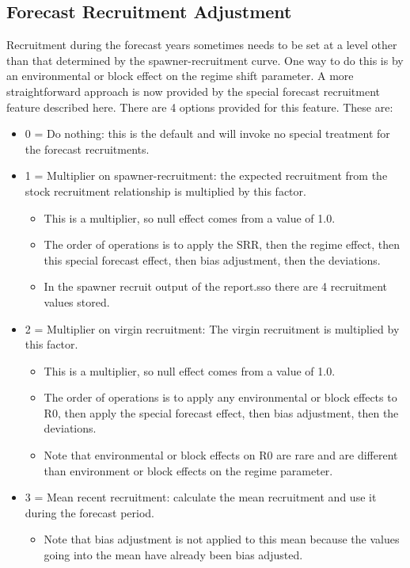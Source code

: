\subsection{Forecast Recruitment Adjustment}
Recruitment during the forecast years sometimes needs to be set at a level other than that determined by the spawner-recruitment curve. One way to do this is by an environmental or block effect on the regime shift parameter. A more straightforward approach is now provided by the special forecast recruitment feature described here. There are 4 options provided for this feature. These are:

\begin{itemize}
	\item 0 = Do nothing: this is the default and will invoke no special treatment for the forecast recruitments.
	\item 1 = Multiplier on spawner-recruitment: the expected recruitment from the stock recruitment relationship is multiplied by this factor.
	\begin{itemize}
		\item This is a multiplier, so null effect comes from a value of 1.0.
		\item The order of operations is to apply the SRR, then the regime effect, then this special forecast effect, then bias adjustment, then the deviations.
		\item In the spawner recruit output of the report.sso there are 4 recruitment values stored.
	\end{itemize}
	\item 2 = Multiplier on virgin recruitment: The virgin recruitment is multiplied by this factor.
	\begin{itemize}
		\item This is a multiplier, so null effect comes from a value of 1.0.
		\item The order of operations is to apply any environmental or block effects to R0, then apply the special forecast effect, then bias adjustment, then the deviations.
		\item Note that environmental or block effects on R0 are rare and are different than environment or block effects on the regime parameter.
	\end{itemize}
	\item 3 = Mean recent recruitment: calculate the mean recruitment and use it during the forecast period.
	\begin{itemize}
		\item Note that bias adjustment is not applied to this mean because the values going into the mean have already been bias adjusted.
	\end{itemize}
\end{itemize}

